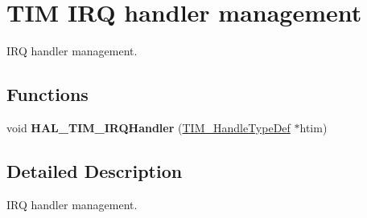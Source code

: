 \hypertarget{group___t_i_m___exported___functions___group7}{}\section{T\+IM I\+RQ handler management}
\label{group___t_i_m___exported___functions___group7}


I\+RQ handler management.  


\subsection*{Functions}
\begin{DoxyCompactItemize}
\item 
\mbox{\label{group___t_i_m___exported___functions___group7_ga2dc3ef34340412aa8a01d734d2ff8f88}} 
void {\bfseries H\+A\+L\+\_\+\+T\+I\+M\+\_\+\+I\+R\+Q\+Handler} (\mbox{\hyperlink{struct_t_i_m___handle_type_def}{T\+I\+M\+\_\+\+Handle\+Type\+Def}} $\ast$htim)
\end{DoxyCompactItemize}


\subsection{Detailed Description}
I\+RQ handler management. 

